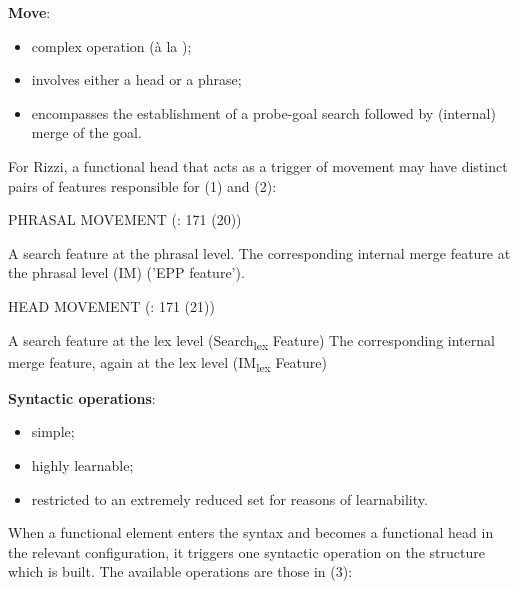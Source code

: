 \documentclass[fleqn,10pt]{wlscirep}
\begin{document}
\noindent\textbf{Move}: 
\begin{itemize}
    \item \vspace*{-2mm} complex operation (à la \citealt{chomsky2001});
    \item \vspace*{-2mm} involves either a head or a phrase;
    \item \vspace*{-2mm} encompasses the establishment of a probe-goal search followed by (internal) merge of the goal. 
\end{itemize}

For Rizzi, a functional head that acts as a trigger of movement may have distinct pairs of features responsible for (1) and (2):

\begin{exe}
    \ex PHRASAL MOVEMENT (\citealt{rizzi2017}: 171 (20))
        \begin{xlist}
            \ex A search feature at the phrasal level.
            \ex The corresponding internal merge feature at the phrasal level (IM) ('EPP feature').
        \end{xlist}
\end{exe}

\begin{exe}
    \ex HEAD MOVEMENT (\citealt{rizzi2017}: 171 (21)) 
        \begin{xlist}
            \ex A search feature at the lex level (Search\textsubscript{lex} Feature)
            \ex The corresponding internal merge feature, again at the lex level (IM\textsubscript{lex} Feature)
        \end{xlist}
\end{exe}

\noindent\textbf{Syntactic operations}: 
\begin{itemize}
    \item \vspace*{-2mm} simple;
    \item \vspace*{-2mm} highly learnable;
    \item \vspace*{-2mm} restricted to an extremely reduced set for reasons of learnability.
\end{itemize}	

\noindent When a functional element enters the syntax and becomes a functional head in the relevant configuration, it triggers one syntactic operation on the structure which is built. The available operations are those in (3):
\end{document}
